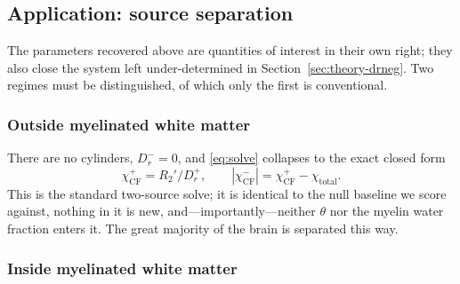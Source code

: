 \documentclass[AMA,STIX2COL,Linenumberson]{MRM}
\begin{document}
\subsection{Application: source separation}
\label{sec:theory-sep}

The parameters recovered above are quantities of interest in their own right; they also close the system left under-determined in Section~\ref{sec:theory-drneg}. Two regimes must be distinguished, of which only the first is conventional.

\subsubsection{Outside myelinated white matter}

There are no cylinders, $D_r^{-}=0$, and \eqref{eq:solve} collapses to the exact closed form
\begin{equation}
\chi^{+}_{\mathrm{CF}} = R_2'/D_r^{+}, \qquad |\chi^{-}_{\mathrm{CF}}| = \chi^{+}_{\mathrm{CF}} - \chi_{\mathrm{total}} .
\label{eq:cf}
\end{equation}
This is the standard two-source solve; it is identical to the null baseline we score against, nothing in it is new, and---importantly---neither $\theta$ nor the myelin water fraction enters it. The great majority of the brain is separated this way.

\subsubsection{Inside myelinated white matter}
\end{document}
